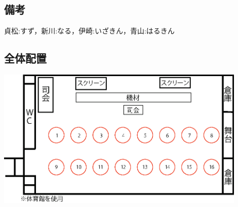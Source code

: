 \subsection{備考}
貞松:すず，新川:なる，伊崎:いざきん，青山:はるきん
\subsection{全体配置}
\begin{center}
\includegraphics[width=12cm]{./21/reiout1.eps}
\label{fig:ice}

\end{center}
